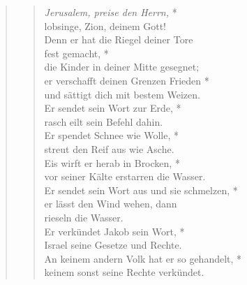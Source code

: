 \vspace{0.6cm}

\def\greinitialformat#1{{\fontsize{40}{40}\selectfont #1}}
\gresetfirstlineaboveinitial{\small \textcolor{red}{Ps 147b}}{}
\setaboveinitialseparation{0.72mm}

\vspace{0.3cm}

\begin{quote}
\begin{verse}
\textit{ Jerusalem, preise den Herrn,} *\\
lobsinge, Zion, deinem Gott! \\
\vin Denn er hat die Riegel deiner Tore\\ \vin fest gemacht, *\\
\vin die Kinder in deiner Mitte gesegnet;\\
er verschafft deinen Grenzen Frieden *\\
und sättigt dich mit bestem Weizen. \\
\vin Er sendet sein Wort zur Erde, *\\
\vin rasch eilt sein Befehl dahin. \\
Er spendet Schnee wie Wolle, *\\
streut den Reif aus wie Asche. \\
\vin Eis wirft er herab in Brocken, *\\
\vin vor seiner Kälte erstarren die Wasser.\\
Er sendet sein Wort aus und sie schmelzen, *\\
er lässt den Wind wehen, dann \\rieseln die Wasser.\\
\vin Er verkündet Jakob sein Wort, *\\
\vin Israel seine Gesetze und Rechte. \\
An keinem andern Volk hat er so gehandelt, *\\
keinem sonst seine Rechte verkündet. \\
\end{verse}
\end{quote}

\vspace{0.3cm}

\def\greinitialformat#1{{\fontsize{40}{40}\selectfont #1}}
\gresetfirstlineaboveinitial{\small \textcolor{red}{Phil 2,1-6}}{}
\setaboveinitialseparation{0.72mm}

